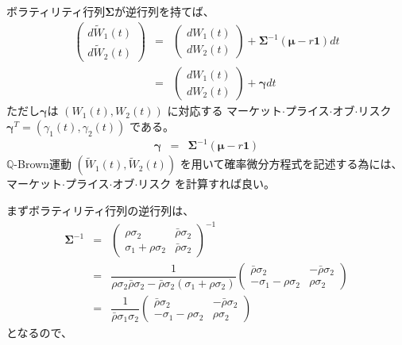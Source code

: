 \documentclass[uplatex,a4j,12pt,dvipdfmx]{jsarticle}
\begin{document}
%
%
ボラティリティ行列${\bm \Sigma}$が逆行列を持てば、
%
%
\begin{eqnarray*}
	\left(
	\begin{array}{c}
			d \tilde{W}_{1}(t)
			\\
			d \tilde{W}_{2}(t)
		\end{array}
	\right)
	&=&
	\left(
	\begin{array}{c}
			dW_{1}(t)
			\\
			dW_{2}(t)
		\end{array}
	\right)
	+
	{\bm \Sigma}^{-1}
	( {\bm \mu} - r {\bm 1} ) dt
	\\ &=&
	\left(
	\begin{array}{c}
			dW_{1}(t)
			\\
			dW_{2}(t)
		\end{array}
	\right)
	+
	{\bm \gamma}dt
\end{eqnarray*}
%
%
ただし${\bm \gamma}$は
$(W_{1}(t),W_{2}(t))$
に対応する
マーケット$\cdot$プライス$\cdot$オブ$\cdot$リスク
${\bm \gamma}^{T} = (\gamma_{1}(t),\gamma_{2}(t))$
である。
%
%
\begin{eqnarray*}
	{\bm \gamma}
	&=&
	{\bm \Sigma}^{-1}
	( {\bm \mu} - r {\bm 1} )
\end{eqnarray*}
%
%
$\mathbb{Q}$-Brown運動
$(\tilde{W}_{1}(t),\tilde{W}_{2}(t))$
を用いて確率微分方程式を記述する為には、
マーケット$\cdot$プライス$\cdot$オブ$\cdot$リスク
を計算すれば良い。

まずボラティリティ行列の逆行列は、
%
%
\begin{eqnarray*}
	{\bm \Sigma}^{-1}
	&=&
	\left(
	\begin{array}{cc}
		\rho \sigma_{2}              & \bar{\rho} \sigma_{2}
		\\
		\sigma_{1} + \rho \sigma_{2} & \bar{\rho} \sigma_{2}
	\end{array}
	\right)^{-1}
	\\ &=&
	\dfrac{1}{
		\rho \sigma_{2} \bar{\rho} \sigma_{2} - \bar{\rho} \sigma_{2}(\sigma_{1} + \rho \sigma_{2}) }
	\left(
	\!\!
	\begin{array}{cc}
			\bar{\rho} \sigma_{2}          & - \bar{\rho} \sigma_{2}
			\\
			- \sigma_{1} - \rho \sigma_{2} & \rho \sigma_{2}
		\end{array}
	\!\!
	\right)
	\\ &=&
	\dfrac{1}{
		\bar{\rho} \sigma_{1} \sigma_{2} }
	\left(
	\!\!
	\begin{array}{cc}
			\bar{\rho} \sigma_{2}          & - \bar{\rho} \sigma_{2}
			\\
			- \sigma_{1} - \rho \sigma_{2} & \rho \sigma_{2}
		\end{array}
	\!\!
	\right)
\end{eqnarray*}
%
%
となるので、
\end{document}
